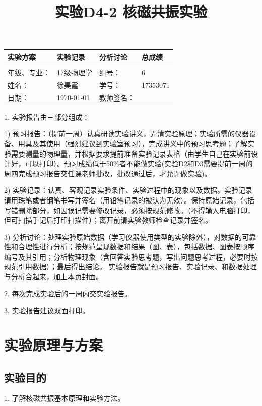 \documentclass{ctexart}
\title{实验D4-2 核磁共振实验}
\begin{document}
\maketitle

\begin{tabular}{|p{8em}|p{8em}|p{8em}|p{5em}|}
\hline
		\large{实验方案} &\large{实验记录}  &\large{分析讨论} &\large{总成绩}\\
		\hline
		        &          &          &  \\
	    \hline
	\hline 
	年级、专业： &17级物理学 &组号：& 6 \\
	\hline
	姓名：& 徐昊霆 &学号：&17353071  \\
	\hline
	日期：& \today&教师签名： &  \\
    \hline	
        \end{tabular}
        
        1. 实验报告由三部分组成：
        
        1) 预习报告：（提前一周）认真研读实验讲义，弄清实验原理；实验所需的仪器设备、用具及其使用（强烈建议到实验室预习），完成讲义中的预习思考题；了解实验需要测量的物理量，并根据要求提前准备实验记录表格（由学生自己在实验前设计好，可以打印）。预习成绩低于50\%者不能做实验(实验D2和D3需要提前一周的周四完成预习报告交任课老师批改，批改通过后，才允许做实验)。
        
        2) 实验记录：认真、客观记录实验条件、实验过程中的现象以及数据。实验记录请用珠笔或者钢笔书写并签名（用铅笔记录的被认为无效）。保持原始记录，包括写错删除部分，如因误记需要修改记录，必须按规范修改。（不得输入电脑打印，但可扫描手记后打印扫描件）；离开前请实验教师检查记录并签名。
        
    3) 分析讨论：处理实验原始数据（学习仪器使用类型的实验除外），对数据的可靠性和合理性进行分析；按规范呈现数据和结果（图、表），包括数据、图表按顺序编号及其引用；分析物理现象（含回答实验思考题，写出问题思考过程，必要时按规范引用数据）；最后得出结论。
    实验报告就是预习报告、实验记录、和数据处理与分析合起来，加上本页封面。
    
    2. 每次完成实验后的一周内交实验报告。
    
    3. 实验报告建议双面打印。
\newpage
\tableofcontents
\newpage
\section{实验原理与方案}
\subsection{实验目的}
1. 了解核磁共振基本原理和实验方法。
\end{document}
